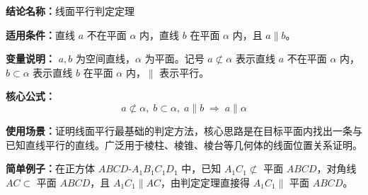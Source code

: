 \textbf{结论名称：}线面平行判定定理

\textbf{适用条件：}直线 \(a\) 不在平面 \(\alpha\) 内，直线 \(b\) 在平面 \(\alpha\) 内，且 \(a \parallel b\)。

\textbf{变量说明：} \(a, b\) 为空间直线，\(\alpha\) 为平面。记号 \(a \not\subset \alpha\) 表示直线 \(a\) 不在平面 \(\alpha\) 内，\(b \subset \alpha\) 表示直线 \(b\) 在平面 \(\alpha\) 内，\(\parallel\) 表示平行。

\textbf{核心公式：}
\[
\boxed{a \not\subset \alpha,\; b \subset \alpha,\; a \parallel b \;\Longrightarrow\; a \parallel \alpha}
\]

\textbf{使用场景：}证明线面平行最基础的判定方法，核心思路是在目标平面内找出一条与已知直线平行的直线。广泛用于棱柱、棱锥、棱台等几何体的线面位置关系证明。

\textbf{简单例子：}在正方体 \(ABCD\text{-}A_1B_1C_1D_1\) 中，已知 \(A_1C_1 \not\subset\) 平面 \(ABCD\)，对角线 \(AC \subset\) 平面 \(ABCD\)，且 \(A_1C_1 \parallel AC\)，由判定定理直接得 \(A_1C_1 \parallel\) 平面 \(ABCD\)。